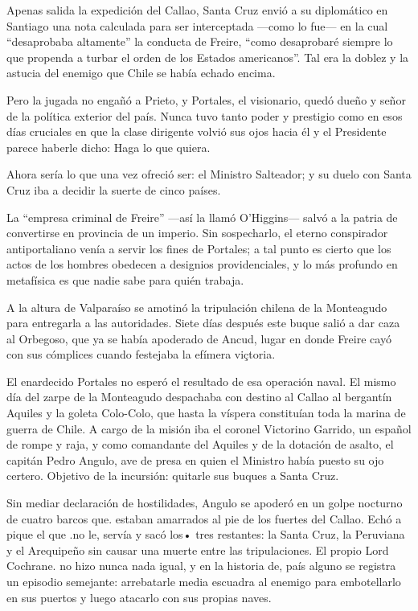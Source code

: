 \documentclass[10pt,twoside,openright]{memoir}
\begin{document}
Apenas salida la expedición del Callao, Santa Cruz envió a su
diplomático en Santiago una nota calculada para ser interceptada ---como
lo fue--- en la cual ``desaprobaba altamente'' la conducta de Freire,
``como desaprobaré siempre lo que propenda a turbar el orden de los
Estados americanos''. Tal era la doblez y la astucia del enemigo que
Chile se había echado encima.

Pero la jugada no engañó a Prieto, y Portales, el visionario, quedó
dueño y señor de la política exterior del país. Nunca tuvo tanto poder y
prestigio como en esos días cruciales en que la clase dirigente volvió
sus ojos hacia él y el Presidente parece haberle dicho: Haga lo que
quiera.

Ahora sería lo que una vez ofreció ser: el Ministro Salteador; y su
duelo con Santa Cruz iba a decidir la suerte de cinco países.

La ``empresa criminal de Freire'' ---así la llamó O'Higgins--- salvó a la
patria de convertirse en provincia de un imperio. Sin sospecharlo, el
eterno conspirador antiportaliano venía a servir los fines de Portales;
a tal punto es cierto que los actos de los hombres obedecen a designios
providenciales, y lo más profundo en metafísica es que nadie sabe para
quién trabaja.

A la altura de Valparaíso se amotinó la tripulación chilena de la
Monteagudo para entregarla a las autoridades. Siete días después este
buque salió a dar caza al Orbegoso, que ya se había apoderado de Ancud,
lugar en donde Freire cayó con sus cómplices cuando festejaba la efímera
viçtoria.

El enardecido Portales no esperó el resultado de esa operación naval. El
mismo día del zarpe de la Monteagudo despachaba con destino al Callao al
bergantín Aquiles y la goleta Colo-Colo, que hasta la víspera
constituían toda la marina de guerra de Chile. A cargo de la misión iba
el coronel Victorino Garrido, un español de rompe y raja, y como
comandante del Aquiles y de la dotación de asalto, el capitán Pedro
Angulo, ave de presa en quien el Ministro había puesto su ojo certero.
Objetivo de la incursión: quitarle sus buques a Santa Cruz.

Sin mediar declaración de hostilidades, Angulo se apoderó en un golpe
nocturno de cuatro barcos que. estaban amarrados al pie de los fuertes
del Callao. Echó a pique el que .no le, servía y sacó los• tres
restantes: la Santa Cruz, la Peruviana y el Arequipeño sin causar una
muerte entre las tripulaciones. El propio Lord Cochrane. no hizo nunca
nada igual, y en la historia de, país alguno se registra un episodio
semejante: arrebatarle media escuadra al enemigo para embotellarlo en
sus puertos y luego atacarlo con sus propias naves.
\end{document}
